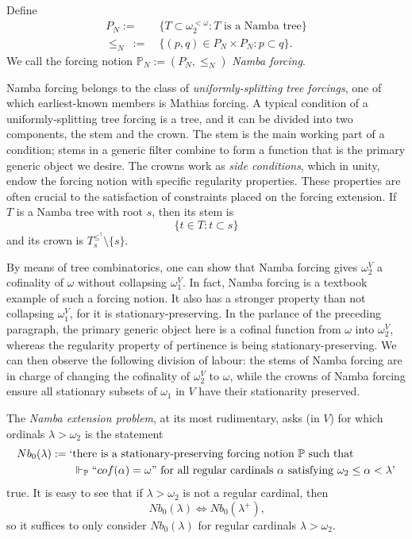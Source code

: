 \documentclass[12pt]{article}
\numberwithin{equation}{section}
\begin{document}
\begin{defi}[Namba]
Define
\begin{align*}
    P_N := \ & \{T \subset \omega_2^{< \omega} : T \text{ is a Namba tree}\} \\
    \leq_N \ := \ & \{(p, q) \in P_N \times P_N : p \subset q\} \text{.}
\end{align*}
We call the forcing notion $\mathbb{P}_N := (P_N, \leq_N)$ \emph{Namba forcing}.
\end{defi}

Namba forcing belongs to the class of \emph{uniformly-splitting tree forcings}, one of which earliest-known members is Mathias forcing. A typical condition of a uniformly-splitting tree forcing is a tree, and it can be divided into two components, the stem and the crown. The stem is the main working part of a condition; stems in a generic filter combine to form a function that is the primary generic object we desire. The crowns work as \emph{side conditions}, which in unity, endow the forcing notion with specific regularity properties. These properties are often crucial to the satisfaction of constraints placed on the forcing extension. If $T$ is a Namba tree with root $s$, then its stem is $$\{t \in T : t \subset s\}$$ and its crown is $T_s^{\leq^{\dagger}} \setminus \{s\}$.

By means of tree combinatorics, one can show that Namba forcing gives $\omega_2^V$ a cofinality of $\omega$ without collapsing $\omega_1^V$. In fact, Namba forcing is a textbook example of such a forcing notion. It also has a stronger property than not collapsing $\omega_1^V$, for it is stationary-preserving. In the parlance of the preceding paragraph, the primary generic object here is a cofinal function from $\omega$ into $\omega_2^V$, whereas the regularity property of pertinence is being stationary-preserving. We can then observe the following division of labour: the stems of Namba forcing are in charge of changing the cofinality of $\omega_2^V$ to $\omega$, while the crowns of Namba forcing ensure all stationary subsets of $\omega_1$ in $V$ have their stationarity preserved.

The \textit{Namba extension problem}, at its most rudimentary, asks (in $V$) for which ordinals $\lambda > \omega_2$ is the statement
\begin{align*}
    Nb_0(\lambda) := \text{`} & \text{there is a stationary-preserving forcing notion } \mathbb{P} \text{ such that} \\ 
    & \Vdash_{\mathbb{P}} ``cof(\alpha) = \omega" \text{ for all regular cardinals } \alpha \text{ satisfying } \omega_2 \leq \alpha < \lambda \text{'}
\end{align*} 
true. It is easy to see that if $\lambda > \omega_2$ is not a regular cardinal, then 
\begin{equation*}
    Nb_0(\lambda) \iff Nb_0(\lambda^+) \text{,}
\end{equation*}
so it suffices to only consider $Nb_0(\lambda)$ for regular cardinals $\lambda > \omega_2$.
\end{document}
